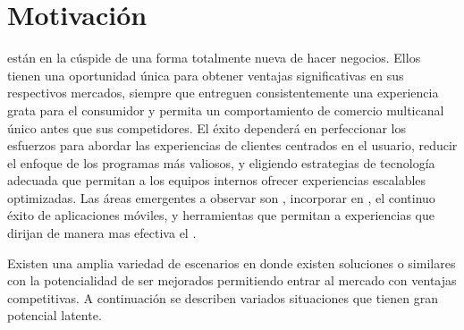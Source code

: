
\section{Motivación}\label{cap:intro:motivacion}

\online \retailers están en la cúspide de una forma totalmente nueva de hacer negocios. Ellos tienen una oportunidad única para obtener ventajas significativas en sus respectivos mercados, siempre que entreguen consistentemente una experiencia grata para el consumidor y permita un comportamiento de comercio multicanal único antes que sus competidores. El éxito dependerá en perfeccionar los esfuerzos para abordar las experiencias de clientes centrados en el usuario, reducir el enfoque de los programas más valiosos, y eligiendo estrategias de tecnología adecuada que permitan a los equipos internos ofrecer experiencias escalables optimizadas. Las áreas emergentes a observar son \realtime \retail \analytics, incorporar \socialnetwork en \ecommerce, el continuo éxito de aplicaciones móviles, y herramientas que permitan a \retailers \scale experiencias que dirijan de manera mas efectiva el \merchandising.


Existen una amplia variedad de escenarios en donde existen soluciones \ecommerce o similares con la potencialidad de ser mejorados permitiendo entrar al mercado con ventajas competitivas. A continuación se describen variados situaciones que tienen gran potencial latente.

